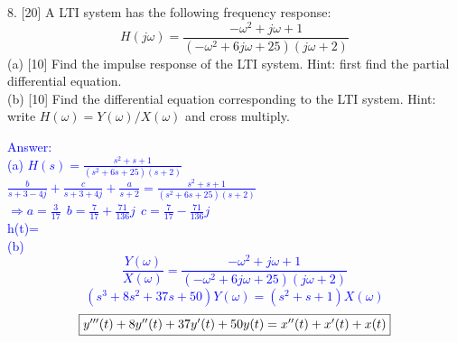 \documentclass[12pt,a4paper]{article}
\begin{document}
\begin{tcolorbox}[colback = white]
8. [20] A LTI system has the following frequency response:
$$
H(j \omega)=\frac{-\omega^{2}+j \omega+1}{\left(-\omega^{2}+6 j \omega+25\right)(j \omega+2)}
$$
(a) [10] Find the impulse response of the LTI system. Hint: first find the partial differential equation.\\
(b) [10] Find the differential equation corresponding to the LTI system. Hint: write $H(\omega)=Y(\omega) / X(\omega)$ and cross multiply.
\end{tcolorbox}
\begin{tcolorbox}
\normalsize
\textcolor{blue}{Answer:\\
(a) $H(s)=\frac{s^2+s+1}{(s^2+6s+25)(s+2)}$\\
$\frac{b}{s+3-4 j}+\frac{c}{s+3+4 j}+\frac{a}{s+2}=\frac{s^{2}+s+1}{\left(s^{2}+6 s+25\right)(s+2)}$
$
\Rightarrow
a=\frac{3}{17}~~
b=\frac{7}{17}+\frac{71}{136} j~~
c=\frac{7}{17}-\frac{71}{136} j
$\\
h(t)=\\
(b)
$$
\frac{Y(\omega)}{X(\omega)}=\frac{-\omega^{2}+j \omega+1}{\left(-\omega^{2}+6 j \omega+25\right)(j \omega+2)}$$
$$
\left(s^{3}+8 s^{2}+37 s+50\right) Y(\omega)=\left(s^{2}+s+1\right) X(\omega)
$$
$$\fbox{$y^{\prime \prime \prime}(t)+8 y^{\prime \prime}(t)+37 y^{\prime}(t)+50 y(t)=x^{\prime \prime}(t)+x^{\prime}(t)+x(t)$} 
$$
}

\end{tcolorbox}

\end{document}
